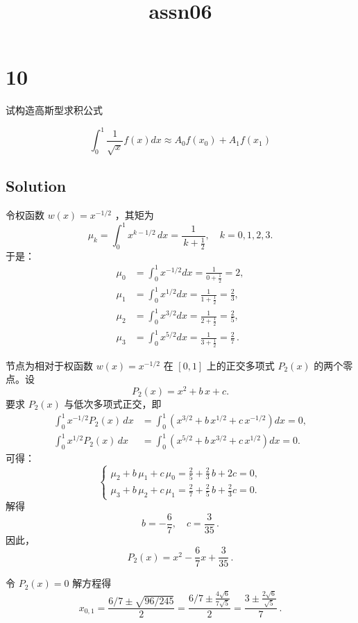\documentclass[11pt]{article}
\title{assn06}
\begin{document}
    
    \maketitle
    
    

    
    \section{10}\label{section}

试构造高斯型求积公式

\[
\int_0^1 \frac{1}{\sqrt x} f(x) dx \approx A_0f(x_0) + A_1f(x_1)
\]

    \subsection{Solution}\label{solution}

令权函数 \(w(x)=x^{-1/2}\) ，其矩为 \[
\mu_k=\int_0^1 x^{k-1/2}\,dx=\frac{1}{\,k+\tfrac12},\quad k=0,1,2,3.
\] 于是： \[
\begin{aligned}
\mu_0&=\int_0^1 x^{-1/2}dx=\frac{1}{0+\tfrac12}=2,\\[1mm]
\mu_1&=\int_0^1 x^{1/2}dx=\frac{1}{1+\tfrac12}=\frac{2}{3},\\[1mm]
\mu_2&=\int_0^1 x^{3/2}dx=\frac{1}{2+\tfrac12}=\frac{2}{5},\\[1mm]
\mu_3&=\int_0^1 x^{5/2}dx=\frac{1}{3+\tfrac12}=\frac{2}{7}\,.
\end{aligned}
\]

节点为相对于权函数 \(w(x)=x^{-1/2}\) 在 \([0,1]\) 上的正交多项式
\(P_2(x)\) 的两个零点。设 \[
P_2(x)=x^2+ b\,x+c.
\] 要求 \(P_2(x)\) 与低次多项式正交，即 \[
\begin{aligned}
\int_0^1 x^{-1/2} P_2(x)\,dx&=\int_0^1 \left(x^{3/2}+b\,x^{1/2}+c\,x^{-1/2}\right)dx=0,\\[1mm]
\int_0^1 x^{1/2} P_2(x)\,dx&=\int_0^1 \left(x^{5/2}+b\,x^{3/2}+c\,x^{1/2}\right)dx=0.
\end{aligned}
\] 可得： \[
\begin{cases}
\mu_2 +b\,\mu_1+c\,\mu_0= \frac{2}{5}+\frac{2}{3}\,b+2c=0,\\[1mm]
\mu_3+b\,\mu_2+c\,\mu_1= \frac{2}{7}+\frac{2}{5}\,b+\frac{2}{3}c=0.
\end{cases}
\] 解得 \[
b=-\frac{6}{7},\quad c=\frac{3}{35}\,.
\] 因此， \[
P_2(x)=x^2-\frac{6}{7}x+\frac{3}{35}\,.
\]

令 \(P_2(x)=0\) 解方程得 \[
x_{0,1}=\frac{6/7\pm\sqrt{96/245}}{2}=\frac{6/7\pm \frac{4\sqrt6}{7\sqrt5}}{2}
=\frac{3\pm \frac{2\sqrt6}{\sqrt5}}{7}\,.
\]
\end{document}
